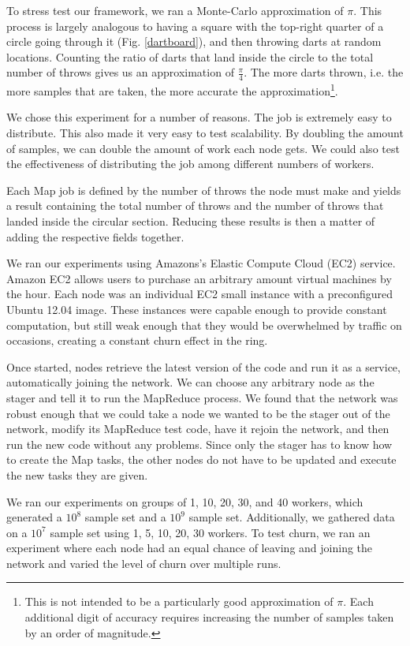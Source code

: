 \documentclass[10pt, conference, compsocconf]{IEEEtran}
\begin{document}
To stress test our framework, we ran a Monte-Carlo approximation of $\pi$. This process is largely analogous to having a square with the top-right quarter of a circle going through it (Fig. \ref{dartboard}), and then throwing darts at random locations.  Counting the ratio of darts that land inside the circle to the total number of throws gives us an approximation of $\frac{\pi}{4}$.  The more darts thrown, i.e. the more samples that are taken, the more accurate the approximation\footnote{This is not intended to be a particularly good approximation of $\pi$. Each additional digit of accuracy requires increasing the number of samples taken by an order of magnitude.}.

We chose this experiment for a number of reasons. The job is extremely easy to distribute.  This also made it very easy to test scalability. By doubling the amount of samples, we can double the amount of work each node gets.  We could also test the effectiveness of distributing the job among different numbers of workers.

Each Map job is defined by the number of throws the node must make and yields a result containing the total number of throws and the number of throws that landed inside the circular section.  Reducing these results is then a matter of adding the respective fields together. 

We ran our experiments using Amazons's Elastic Compute Cloud (EC2) service.  Amazon EC2 allows users to purchase an arbitrary amount virtual machines by the hour. Each node was an individual EC2 small instance \cite{amazon-instances} with a preconfigured Ubuntu 12.04 image.  These instances were capable enough to provide constant computation, but still weak enough that they would be overwhelmed by traffic on occasions, creating a constant churn effect in the ring.  

Once started, nodes retrieve the latest version of the code and run it as a service, automatically joining the network.  We can choose any arbitrary node as the stager and tell it to run the MapReduce process. We found that the network was robust enough that we could take a node we wanted to be the stager out of the network, modify its MapReduce test code, have it rejoin the network, and then run the new code without any problems. Since only the stager has to know how to create the Map tasks, the other nodes do not have to be updated and execute the new tasks they are given.

We ran our experiments on groups of 1, 10, 20, 30, and 40 workers, which generated a $10^{8}$ sample set and a $10^{9}$ sample set.  Additionally, we gathered data on a $10^{7}$ sample set using 1, 5, 10, 20, 30 workers.  To test churn, we ran an experiment where each node had an equal chance of leaving and joining the network and varied the level of churn over multiple runs.  
\end{document}
